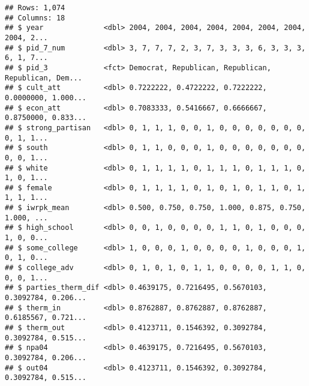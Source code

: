 \documentclass[
]{article}
\newenvironment{Shaded}{\begin{snugshade}}{\end{snugshade}}
\newcommand{\DecValTok}[1]{\textcolor[rgb]{0.00,0.00,0.81}{#1}}
\newcommand{\KeywordTok}[1]{\textcolor[rgb]{0.13,0.29,0.53}{\textbf{#1}}}
\newcommand{\NormalTok}[1]{#1}
\newcommand{\OperatorTok}[1]{\textcolor[rgb]{0.81,0.36,0.00}{\textbf{#1}}}
\newcommand{\StringTok}[1]{\textcolor[rgb]{0.31,0.60,0.02}{#1}}
\begin{document}
\begin{verbatim}
## Rows: 1,074
## Columns: 18
## $ year              <dbl> 2004, 2004, 2004, 2004, 2004, 2004, 2004, 2004, 2...
## $ pid_7_num         <dbl> 3, 7, 7, 7, 2, 3, 7, 3, 3, 3, 6, 3, 3, 3, 6, 1, 7...
## $ pid_3             <fct> Democrat, Republican, Republican, Republican, Dem...
## $ cult_att          <dbl> 0.7222222, 0.4722222, 0.7222222, 0.0000000, 1.000...
## $ econ_att          <dbl> 0.7083333, 0.5416667, 0.6666667, 0.8750000, 0.833...
## $ strong_partisan   <dbl> 0, 1, 1, 1, 0, 0, 1, 0, 0, 0, 0, 0, 0, 0, 0, 1, 1...
## $ south             <dbl> 0, 1, 1, 0, 0, 0, 1, 0, 0, 0, 0, 0, 0, 0, 0, 0, 1...
## $ white             <dbl> 0, 1, 1, 1, 1, 0, 1, 1, 1, 0, 1, 1, 1, 0, 1, 0, 1...
## $ female            <dbl> 0, 1, 1, 1, 1, 0, 1, 0, 1, 0, 1, 1, 0, 1, 1, 1, 1...
## $ iwrpk_mean        <dbl> 0.500, 0.750, 0.750, 1.000, 0.875, 0.750, 1.000, ...
## $ high_school       <dbl> 0, 0, 1, 0, 0, 0, 0, 1, 1, 0, 1, 0, 0, 0, 1, 0, 0...
## $ some_college      <dbl> 1, 0, 0, 0, 1, 0, 0, 0, 0, 1, 0, 0, 0, 1, 0, 1, 0...
## $ college_adv       <dbl> 0, 1, 0, 1, 0, 1, 1, 0, 0, 0, 0, 1, 1, 0, 0, 0, 1...
## $ parties_therm_dif <dbl> 0.4639175, 0.7216495, 0.5670103, 0.3092784, 0.206...
## $ therm_in          <dbl> 0.8762887, 0.8762887, 0.8762887, 0.6185567, 0.721...
## $ therm_out         <dbl> 0.4123711, 0.1546392, 0.3092784, 0.3092784, 0.515...
## $ npa04             <dbl> 0.4639175, 0.7216495, 0.5670103, 0.3092784, 0.206...
## $ out04             <dbl> 0.4123711, 0.1546392, 0.3092784, 0.3092784, 0.515...
\end{verbatim}

\begin{Shaded}
\end{Shaded}
\end{document}
